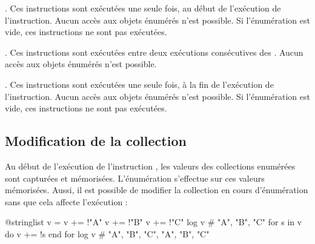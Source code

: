 {. Ces instructions sont exécutées une seule fois, au début de l'exécution de l'instruction. Aucun accès aux objets énumérés n'est possible. Si l'énumération est vide, ces instructions ne sont pas exécutées.

. Ces instructions sont exécutées entre deux exécutions consécutives des . Aucun accès aux objets énumérés n'est possible.

. Ces instructions sont exécutées une seule fois, à la fin de l'exécution de l'instruction. Aucun accès aux objets énumérés n'est possible. Si l'énumération est vide, ces instructions ne sont pas exécutées.


\subsection{Modification de la collection}

Au début de l'exécution de l'instruction , les valeurs des collections enumérées sont capturées et mémorisées. L'énumération s'effectue sur ces valeurs mémorisées. Aussi, il est possible de modifier la collection en cours d'énumération sans que cela affecte l'exécution :
\begin{galgascode}
@stringlist v = {}
v += !"A"
v += !"B"
v += !"C"
log v # "A", "B", "C"
for s in v do
  v += !s
end for
log v # "A", "B", "C", "A", "B", "C"
\end{galgascode}


















}
